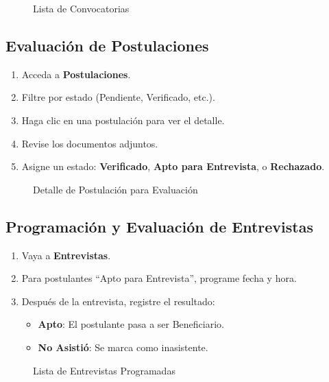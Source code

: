 \documentclass[12pt,a4paper]{article}
\begin{document}
\begin{figure}[h]
    \centering
    \caption{Lista de Convocatorias}
    \label{fig:convocatorias}
\end{figure}

\subsection{Evaluación de Postulaciones}
\begin{enumerate}
    \item Acceda a \textbf{Postulaciones}.
    \item Filtre por estado (Pendiente, Verificado, etc.).
    \item Haga clic en una postulación para ver el detalle.
    \item Revise los documentos adjuntos.
    \item Asigne un estado: \textbf{Verificado}, \textbf{Apto para Entrevista}, o \textbf{Rechazado}.
\end{enumerate}

\begin{figure}[h]
    \centering
    \caption{Detalle de Postulación para Evaluación}
    \label{fig:evaluar_postulacion}
\end{figure}

\subsection{Programación y Evaluación de Entrevistas}
\begin{enumerate}
    \item Vaya a \textbf{Entrevistas}.
    \item Para postulantes ``Apto para Entrevista'', programe fecha y hora.
    \item Después de la entrevista, registre el resultado:
    \begin{itemize}
        \item \textbf{Apto}: El postulante pasa a ser Beneficiario.
        \item \textbf{No Asistió}: Se marca como inasistente.
    \end{itemize}
\end{enumerate}

\begin{figure}[h]
    \centering
    \caption{Lista de Entrevistas Programadas}
    \label{fig:entrevistas}
\end{figure}
\end{document}
